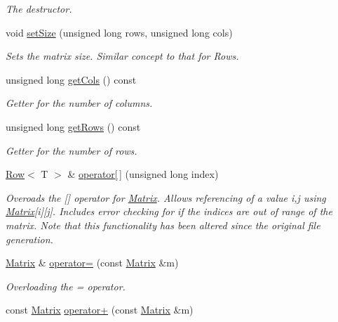 \begin{DoxyCompactItemize}
\begin{DoxyCompactList}\small\item\em The destructor. \end{DoxyCompactList}\item 
void \hyperlink{class_matrix_aa393296d4132d7aafc4e236ddfe59f06}{set\+Size} (unsigned long rows, unsigned long cols)
\begin{DoxyCompactList}\small\item\em Sets the matrix size. Similar concept to that for Rows. \end{DoxyCompactList}\item 
unsigned long \hyperlink{class_matrix_a9b4ce445c65dcea66c66dda875cc39d8}{get\+Cols} () const 
\begin{DoxyCompactList}\small\item\em Getter for the number of columns. \end{DoxyCompactList}\item 
unsigned long \hyperlink{class_matrix_a442879db6473eeab202928dc47992206}{get\+Rows} () const 
\begin{DoxyCompactList}\small\item\em Getter for the number of rows. \end{DoxyCompactList}\item 
\hyperlink{class_row}{Row}$<$ T $>$ \& \hyperlink{class_matrix_ae7e14b4bd8bb570260a4e578e4a601b7}{operator\mbox{[}$\,$\mbox{]}} (unsigned long index)
\begin{DoxyCompactList}\small\item\em Overoads the \mbox{[}\mbox{]} operator for \hyperlink{class_matrix}{Matrix}. Allows referencing of a value i,j using \hyperlink{class_matrix}{Matrix}\mbox{[}i\mbox{]}\mbox{[}j\mbox{]}. Includes error checking for if the indices are out of range of the matrix. Note that this functionality has been altered since the original file generation. \end{DoxyCompactList}\item 
\hyperlink{class_matrix}{Matrix} \& \hyperlink{class_matrix_a94508f84ba0d62e81aa8d508aa43f1ec}{operator=} (const \hyperlink{class_matrix}{Matrix} \&m)
\begin{DoxyCompactList}\small\item\em Overloading the = operator. \end{DoxyCompactList}\item 
const \hyperlink{class_matrix}{Matrix} \hyperlink{class_matrix_a311f3649e41cb4a3155f3f71a65829cb}{operator+} (const \hyperlink{class_matrix}{Matrix} \&m)

\end{DoxyCompactItemize}
